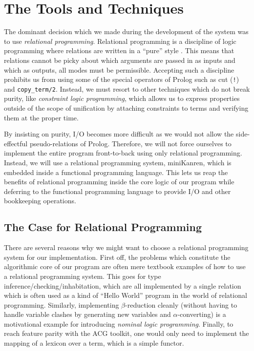 \section{The Tools and Techniques}

The dominant decision which we made during the development of the system
was to use \emph{relational programming}. Relational programming is a
discipline of logic programming where relations are written in a
``pure'' style \cite{byrd2010relational}. This means that relations
cannot be picky about which arguments are passed in as inputs and which
as outputs, all modes must be permissible. Accepting such a discipline
prohibits us from using some of the special operators of Prolog such as
cut (\texttt{!}) and \texttt{copy\_term/2}. Instead, we must resort to
other techniques which do not break purity, like \emph{constraint logic
  programming}, which allows us to express properties outside of the
scope of unification by attaching constraints to terms and verifying
them at the proper time.

By insisting on purity, I/O becomes more difficult as we would not allow
the side-effectful pseudo-relations of Prolog. Therefore, we will not
force ourselves to implement the entire program front-to-back using only
relational programming. Instead, we will use a relational programming
system, miniKanren, which is embedded inside a functional programming
language. This lets us reap the benefits of relational programming
inside the core logic of our program while deferring to the functional
programming language to provide I/O and other bookkeeping operations.

\subsection{The Case for Relational Programming}

There are several reasons why we might want to choose a relational
programming system for our implementation. First off, the problems which
constitute the algorithmic core of our program are often mere textbook
examples of how to use a relational programming system. This goes for
type inference/checking/inhabitation, which are all implemented by a
single relation which is often used as a kind of ``Hello World'' program
in the world of relational programming. Similarly, implementing
$\beta$-reduction cleanly (without having to handle variable clashes by
generating new variables and $\alpha$-converting) is a motivational
example for introducing \emph{nominal logic programming}. Finally, to
reach feature parity with the ACG toolkit, one would only need to
implement the mapping of a lexicon over a term, which is a simple
functor.

